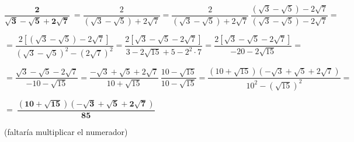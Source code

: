 \begin{miejercicio}

$\boldsymbol{ \dfrac{2}{\sqrt{3}-\sqrt{5}+2\sqrt{7}} } \ = 
\dfrac{2}{(\sqrt{3}-\sqrt{5})+2\sqrt{7}}=
\dfrac{2}{(\sqrt{3}-\sqrt{5})+2\sqrt{7}}\, \dfrac{(\sqrt{3}-\sqrt{5})-2\sqrt{7}}{(\sqrt{3}-\sqrt{5})-2\sqrt{7}}=$

$= \dfrac{2[(\sqrt{3}-\sqrt{5})-2\sqrt{7}]}{(\sqrt{3}-\sqrt{5})^2-(2\sqrt{7})^2}=
 \dfrac{2[\sqrt{3}-\sqrt{5}-2\sqrt{7}]}{3-2\sqrt{15} +5-2^2\cdot 7}=
\dfrac{2[\sqrt{3}-\sqrt{5}-2\sqrt{7}]}{-20-2\sqrt{15} }=  
$

$=\dfrac{\sqrt{3}-\sqrt{5}-2\sqrt{7}}{-10-\sqrt{15} }= \dfrac{-\sqrt{3}+\sqrt{5}+2\sqrt{7}}{10+\sqrt{15} } \, \dfrac{10-\sqrt{15}}{10-\sqrt{15}}= 
\dfrac{(10+\sqrt{15})(-\sqrt{3}+\sqrt{5}+2\sqrt{7})}{10^2-(\sqrt{15})^2 }=$

$=\ \boldsymbol{
\dfrac{(10+\sqrt{15})(-\sqrt{3}+\sqrt{5}+2\sqrt{7})}{85 } }
\quad $ \begin{footnotesize}
 (faltaría multiplicar el numerador)	
 \end{footnotesize}

\end{miejercicio}

\vspace{10mm}

